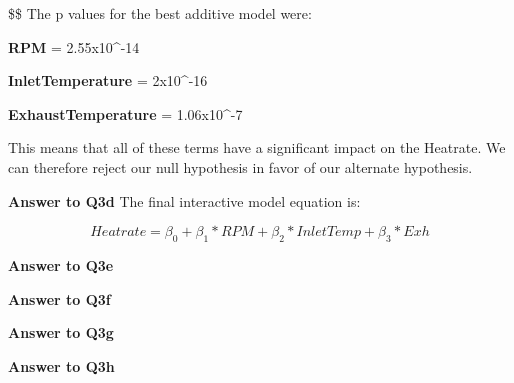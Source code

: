 \documentclass[
]{article}
\begin{document}
\$\$ The p values for the best additive model were:

\textbf{RPM} = 2.55x10\^{}-14

\textbf{InletTemperature} = 2x10\^{}-16

\textbf{ExhaustTemperature} = 1.06x10\^{}-7

This means that all of these terms have a significant impact on the
Heatrate. We can therefore reject our null hypothesis in favor of our
alternate hypothesis.

\textbf{Answer to Q3d} The final interactive model equation is:

\[ Heatrate = \beta_0+\beta_1*RPM+\beta_2*InletTemp+\beta_3*Exh\]

\textbf{Answer to Q3e}

\textbf{Answer to Q3f}

\textbf{Answer to Q3g}

\textbf{Answer to Q3h}
\end{document}
